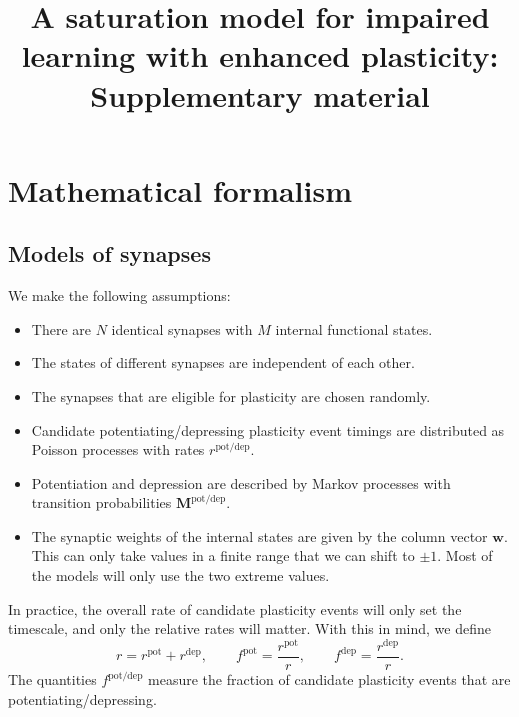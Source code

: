 \documentclass[12pt]{article}
\title{A saturation model for impaired learning with enhanced plasticity: Supplementary material}
\date{}
\newcommand{\w}{\mathbf{w}}
\newcommand{\M}{\mathbf{M}}
\newcommand{\pot}{^{\text{pot}}}
\newcommand{\dep}{^{\text{dep}}}
\newcommand{\potdep}{^{\text{pot/dep}}}
\begin{document}
\maketitle





\tableofcontents
\listoffigures


\section{Mathematical formalism}\label{sec:setup}


\subsection{Models of synapses}\label{sec:synapse}

We make the following assumptions:
\begin{itemize}
  \item There are $N$ identical synapses with $M$ internal functional states.
  \item The states of different synapses are independent of each other.
  \item The synapses that are eligible for plasticity are chosen randomly.
  \item Candidate potentiating/depressing plasticity event timings are distributed as Poisson processes with rates $r\potdep$.
  \item Potentiation and depression are described by Markov processes with transition probabilities $\M\potdep$.
  \item The synaptic weights of the internal states are given by the column vector $\w$. This can only take values in a finite range that we can shift to $\pm1$. Most of the models will only use the two extreme values.
\end{itemize}

In practice, the overall rate of candidate plasticity events will only set the timescale, and only the relative rates will matter.
With this in mind, we define
%
\begin{equation}\label{eq:fpotdep}
  r = r\pot + r\dep,
  \qquad
  f\pot = \frac{r\pot}{r},
  \qquad
  f\dep = \frac{r\dep}{r}.
\end{equation}
%
The quantities $f\potdep$ measure the fraction of candidate plasticity events that are potentiating/depressing.
\end{document}
